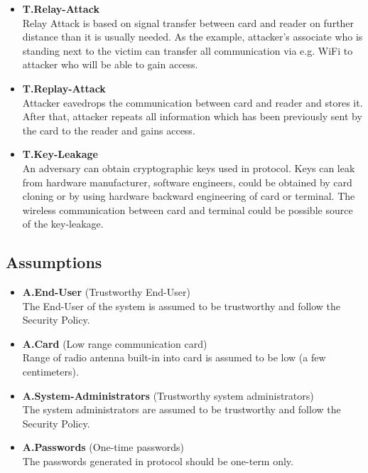 \documentclass[10pt,titlepage]{article}
\begin{document}
\begin{itemize}
\item \textbf{T.Relay-Attack} \\
Relay Attack is based on signal transfer between card and reader on further distance than it is usually needed.
As the example, attacker's associate who is standing next to the victim can transfer all communication via e.g. WiFi to attacker who will be able to gain access.

\item \textbf{T.Replay-Attack } \\
Attacker eavedrops the communication between card and reader and stores it.
After that, attacker repeats all information which has been previously sent by the card to the reader and gains access.

\item \textbf{T.Key-Leakage} \\
An adversary can obtain cryptographic keys used in protocol. Keys can leak from hardware manufacturer, software engineers, could be obtained by card cloning or by using hardware backward engineering of card or terminal. The wireless communication between card and terminal could be possible source of the key-leakage.

\end{itemize}
\subsection{Assumptions}

\begin{itemize}

\item \textbf{A.End-User} (Trustworthy End-User) \\
The End-User of the system is assumed to be trustworthy and follow the Security Policy.

\item \textbf{A.Card }(Low range communication card) \\
Range of radio antenna built-in into card is assumed to be low (a few centimeters).

\item \textbf{A.System-Administrators} (Trustworthy system administrators) \\
The system administrators are assumed to be trustworthy and follow the Security Policy.

\item \textbf{A.Passwords} (One-time passwords) \\ The passwords generated in protocol should be one-term only.
\end{itemize}
\end{document}
